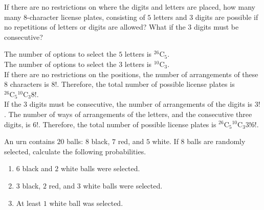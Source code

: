 \documentclass[fleqn, a4paper, 11pt, oneside]{amsart}
\theoremstyle{definition}
\theoremstyle{theorem}
\newcommand*{\comb}[2]{{}^{#1}\mathrm{C}_{#2}}%
\begin{document}
\begin{question}
	If there are no restrictions on where the digits and letters are placed, how many many $8$-character license plates, consisting of $5$ letters and $3$ digits are possible if no repetitions of letters or digits are allowed?
	What if the $3$ digits must be consecutive?
\end{question}

\begin{solution}
	The number of options to select the $5$ letters is $\comb{26}{5}$.\\
	The number of options to select the $3$ letters is $\comb{10}{3}$.\\
	If there are no restrictions on the positions, the number of arrangements of these $8$ characters is $8!$.
	Therefore, the total number of possible license plates is $\comb{26}{5} \comb{10}{3} 8!$.\\
	If the $3$ digits must be consecutive, the number of arrangements of the digits is $3!$.
	The number of ways of arrangements of the letters, and the consecutive three digits, is $6!$.
	Therefore, the total number of possible license plates is $\comb{26}{5} \comb{10}{3} 3! 6!$.\\
\end{solution}

\begin{question}
	An urn contains $20$ balls: $8$ black, $7$ red, and $5$ white.
	If $8$ balls are randomly selected, calculate the following probabilities.
	\begin{enumerate}
		\item $6$ black and $2$ white balls were selected.
		\item $3$ black, $2$ red, and $3$ white balls were selected.
		\item At least $1$ white ball was selected.
	\end{enumerate}
\end{question}
\end{document}
